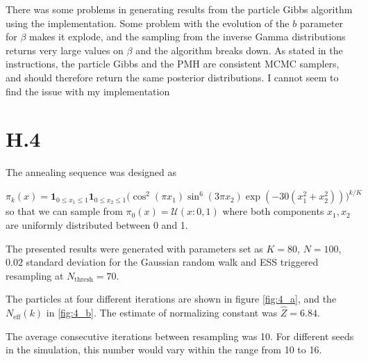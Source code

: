 \documentclass{article}
\begin{document}
There was some problems in generating results from the particle Gibbs algorithm using the implementation. Some problem with the evolution of the $b$ parameter for $\beta$ makes it explode, and the sampling from the inverse Gamma distributions returns very large values on $\beta$ and the algorithm breaks down. As stated in the instructions, the particle Gibbs and the PMH are consistent MCMC samplers, and should therefore return the same posterior distributions. I cannot seem to find the issue with my implementation


\cleardoublepage
\section*{H.4} The annealing sequence was designed as 

	\begin{equation}
		\pi_k(x) = \bm{1}_{0\leq x_1\leq 1}\bm{1}_{0\leq x_2\leq 1}\Big(\cos^2(\pi x_1)\sin^6(3\pi x_2)\exp(-30(x_1^2+x_2^2))\Big)^{k/K}
	\end{equation}
	so that we can sample from $ \pi_0(x) = \mathcal{U}(x: 0, 1) $ where both components $x_1, x_2$ are uniformly distributed between 0 and 1.
	
	The presented results were generated with parameters set as $ K=80 $, $ N=100 $, $0.02$ standard deviation for the Gaussian random walk and ESS triggered resampling at $N_{\text{thresh}}= 70$.
	
	The particles at four different iterations are shown in figure \ref{fig:4_a}, and the $N_\text{eff}(k)$ in \ref{fig:4_b}. The estimate of normalizing constant was $\hat{Z}=6.84$.
	
	The average consecutive iterations between resampling was 10. For different seeds in the simulation, this number would vary within the range from 10 to 16.
\end{document}
